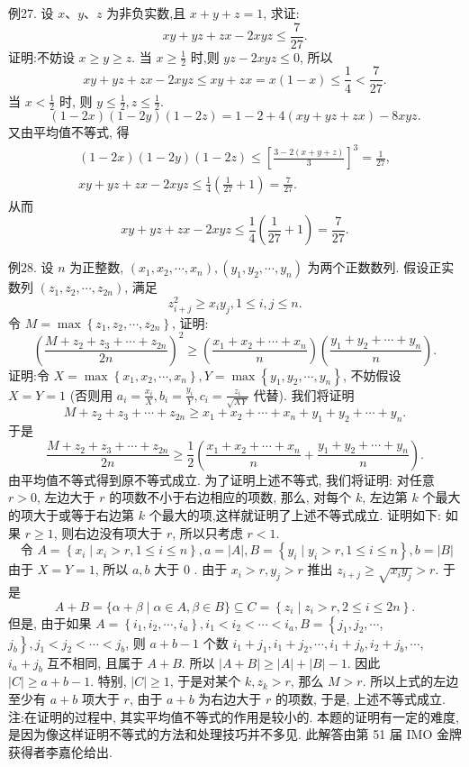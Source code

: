 例27. 设 $x 、 y 、 z$ 为非负实数,且 $x+y+z=1$, 求证:
$$
x y+y z+z x-2 x y z \leqslant \frac{7}{27} .
$$
证明:不妨设 $x \geqslant y \geqslant z$.
当 $x \geqslant \frac{1}{2}$ 时,则 $y z-2 x y z \leqslant 0$, 所以
$$
x y+y z+z x-2 x y z \leqslant x y+z x=x(1-x) \leqslant \frac{1}{4}<\frac{7}{27} .
$$
当 $x<\frac{1}{2}$ 时, 则 $y \leqslant \frac{1}{2}, z \leqslant \frac{1}{2}$.
$$
(1-2 x)(1-2 y)(1-2 z)=1-2+4(x y+y z+z x)-8 x y z .
$$
又由平均值不等式, 得
$$
\begin{gathered}
(1-2 x)(1-2 y)(1-2 z) \leqslant\left[\frac{3-2(x+y+z)}{3}\right]^3=\frac{1}{27}, \\
x y+y z+z x-2 x y z \leqslant \frac{1}{4}\left(\frac{1}{27}+1\right)=\frac{7}{27} .
\end{gathered}
$$
从而
$$
x y+y z+z x-2 x y z \leqslant \frac{1}{4}\left(\frac{1}{27}+1\right)=\frac{7}{27} .
$$



例28. 设 $n$ 为正整数, $\left(x_1, x_2, \cdots, x_n\right),\left(y_1, y_2, \cdots, y_n\right)$ 为两个正数数列.
假设正实数列 $\left(z_1, z_2, \cdots, z_{2 n}\right)$, 满足
$$
z_{i+j}^2 \geqslant x_i y_j, 1 \leqslant i, j \leqslant n .
$$
令 $M=\max \left\{z_1, z_2, \cdots, z_{2 n}\right\}$, 证明:
$$
\left(\frac{M+z_2+z_3+\cdots+z_{2 n}}{2 n}\right)^2 \geqslant\left(\frac{x_1+x_2+\cdots+x_n}{n}\right)\left(\frac{y_1+y_2+\cdots+y_n}{n}\right) .
$$
证明:令 $X=\max \left\{x_1, x_2, \cdots, x_n\right\}, Y=\max \left\{y_1, y_2, \cdots, y_n\right\}$, 不妨假设 $X=Y=1$ (否则用 $a_i=\frac{x_i}{X}, b_i=\frac{y_i}{Y}, c_i=\frac{z_i}{\sqrt{X Y}}$ 代替).
我们将证明
$$
M+z_2+z_3+\cdots+z_{2 n} \geqslant x_1+x_2+\cdots+x_n+y_1+y_2+\cdots+y_n .
$$
于是
$$
\frac{M+z_2+z_3+\cdots+z_{2 n}}{2 n} \geqslant \frac{1}{2}\left(\frac{x_1+x_2+\cdots+x_n}{n}+\frac{y_1+y_2+\cdots+y_n}{n}\right) .
$$
由平均值不等式得到原不等式成立.
为了证明上述不等式, 我们将证明: 对任意 $r>0$, 左边大于 $r$ 的项数不小于右边相应的项数, 那么, 对每个 $k$, 左边第 $k$ 个最大的项大于或等于右边第 $k$ 个最大的项,这样就证明了上述不等式成立.
证明如下:
如果 $r \geqslant 1$, 则右边没有项大于 $r$, 所以只考虑 $r<1$.
$$
\text { 令 } A=\left\{x_i \mid x_i>r, 1 \leqslant i \leqslant n\right\}, a=|A|, B=\left\{y_i \mid y_i>r, 1 \leqslant i \leqslant n\right\}, b=|B|
$$
由于 $X=Y=1$, 所以 $a, b$ 大于 0 .
由于 $x_i>r, y_j>r$ 推出 $z_{i+j} \geqslant \sqrt{x_i y_j}>r$. 于是
$$
A+B=\{\alpha+\beta \mid \alpha \in A, \beta \in B\} \subseteq C=\left\{z_i \mid z_i>r, 2 \leqslant i \leqslant 2 n\right\} .
$$
但是, 由于如果 $A=\left\{i_1, i_2, \cdots, i_a\right\}, i_1<i_2<\cdots<i_a, B=\left\{j_1, j_2, \cdots\right.$, $\left.j_b\right\}, j_1<j_2<\cdots<j_b$, 则 $a+b-1$ 个数 $i_1+j_1, i_1+j_2, \cdots, i_1+j_b, i_2+j_b, \cdots$, $i_a+j_b$ 互不相同, 且属于 $A+B$. 所以 $|A+B| \geqslant|A|+|B|-1$. 因此 $|C| \geqslant a+b-1$. 特别, $|C| \geqslant 1$, 于是对某个 $k, z_k>r$, 那么 $M>r$. 所以上式的左边至少有 $a+b$ 项大于 $r$, 由于 $a+b$ 为右边大于 $r$ 的项数, 于是, 上述不等式成立.
注:在证明的过程中, 其实平均值不等式的作用是较小的.
本题的证明有一定的难度, 是因为像这样证明不等式的方法和处理技巧并不多见.
此解答由第 51 届 IMO 金牌获得者李嘉伦给出.



